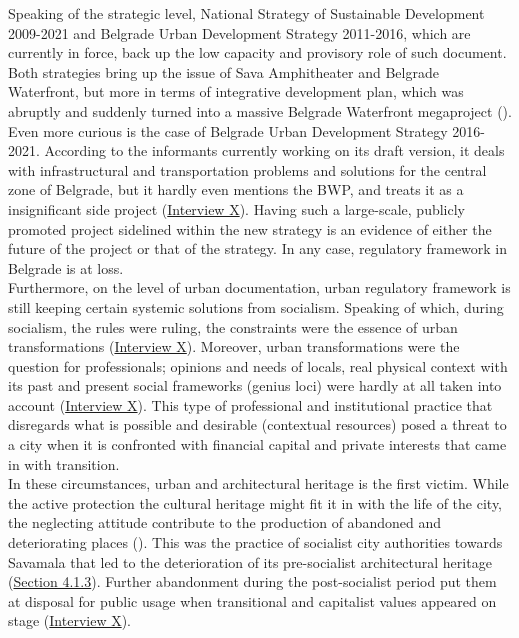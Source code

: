 \documentclass[11pt]{report}
\begin{document}
{Speaking of the strategic level, National Strategy of Sustainable Development 2009-2021 and Belgrade Urban Development Strategy 2011-2016, which are currently in force, back up the low capacity and provisory role of such document.
Both strategies bring up the issue of Sava Amphitheater and Belgrade Waterfront, but more in terms of integrative development plan, which was abruptly and suddenly turned into a massive Belgrade Waterfront megaproject (\cite{NSSD; BUDS; check cultural heritage works}).
\\

Even more curious is the case of Belgrade Urban Development Strategy 2016-2021.
According to the informants currently working on its draft version, it deals with infrastructural and transportation problems and solutions for the central zone of Belgrade, but it hardly even mentions the BWP, and treats it as a insignificant side project (\href{InterviewX}{Interview X}).
Having such a large-scale, publicly promoted project sidelined within the new strategy is an evidence of either the future of the project or that of the strategy.
In any case, regulatory framework in Belgrade is at loss.
\\

Furthermore, on the level of urban documentation, urban regulatory framework is still keeping certain systemic solutions from socialism. Speaking of which, during socialism, the rules were ruling, the constraints were the essence of urban transformations (\href{InterviewX}{Interview X}).
Moreover, urban transformations were the question for professionals; opinions and needs of locals, real physical context with its past and present social frameworks (genius loci) were hardly at all taken into account (\href{InterviewX}{Interview X}).
This type of professional and institutional practice that disregards what is possible and desirable (contextual resources) posed a threat to a city when it is confronted with financial capital and private interests that came in with transition.
\\

In these circumstances, urban and architectural heritage is the first victim.
While the active protection the cultural heritage might fit it in with the life of the city, the neglecting attitude contribute to the production of abandoned and deteriorating places 
(\href{Vanista}{\cite{VanistaLazarevic2015}}).
This was the practice of socialist city authorities towards Savamala that led to the deterioration of its pre-socialist architectural heritage (\href{Section 4.1.3}{Section 4.1.3}).
Further abandonment during the post-socialist period put them at disposal for public usage when transitional and capitalist values appeared on stage
(\href{InterviewX}{Interview X}).
\\

}
\end{document}
